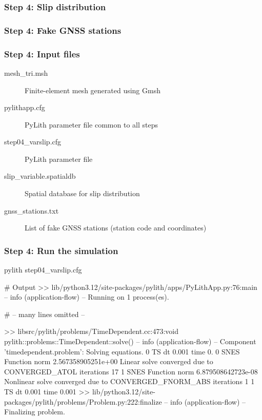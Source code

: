 \documentclass[aspectratio=169]{beamer}
\begin{document}
\begin{frame}
  \frametitle{Step 4: Slip distribution}
  \summary{}

    
\end{frame}


\begin{frame}
  \frametitle{Step 4: Fake GNSS stations}

    
\end{frame}


\begin{frame}
  \frametitle{Step 4: Input files}
  \summary{}

  \begin{description}
  \item[mesh\_tri.msh] Finite-element mesh generated using Gmsh
  \item[pylithapp.cfg] PyLith parameter file common to all steps
  \item[step04\_varslip.cfg] PyLith parameter file
  \item[slip\_variable.spatialdb] Spatial database for slip distribution
  \item[gnss\_stations.txt] List of fake GNSS stations (station code and coordinates)
  \end{description}
    
\end{frame}


\begin{frame}[fragile]
  \frametitle{Step 4: Run the simulation}
  \summary{}

\begin{pyrejournal}
pylith step04_varslip.cfg

# Output
 >> lib/python3.12/site-packages/pylith/apps/PyLithApp.py:76:main
 -- info (application-flow)
 -- Running on 1 process(es).

# -- many lines omitted --

 >> libsrc/pylith/problems/TimeDependent.cc:473:void pylith::problems::TimeDependent::solve()
 -- info (application-flow)
 -- Component 'timedependent.problem': Solving equations.
0 TS dt 0.001 time 0.
    0 SNES Function norm 2.567358905251e+00
      Linear solve converged due to CONVERGED_ATOL iterations 17
    1 SNES Function norm 6.879508642723e-08
    Nonlinear solve converged due to CONVERGED_FNORM_ABS iterations 1
1 TS dt 0.001 time 0.001
 >> lib/python3.12/site-packages/pylith/problems/Problem.py:222:finalize
 -- info (application-flow)
 -- Finalizing problem.
\end{pyrejournal}
  
\end{frame}
\end{document}
